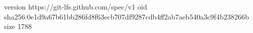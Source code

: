 version https://git-lfs.github.com/spec/v1
oid sha256:0e1d9a67b61bb286fd8f63ecb707df9287cdb4ff2ab7aeb540a3c9f4b238266b
size 1788
